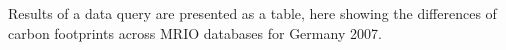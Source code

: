 \label{fig:table} Results of a data query are presented as a table, here showing the differences of carbon footprints across MRIO databases for Germany 2007.